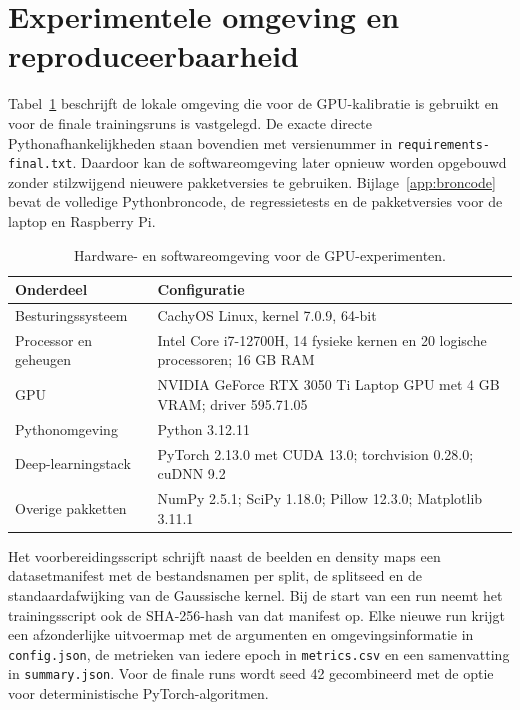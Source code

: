 \section{Experimentele omgeving en reproduceerbaarheid}

Tabel~\ref{tab:experimentele-omgeving} beschrijft de lokale omgeving die voor de GPU-kalibratie is gebruikt en voor de finale trainingsruns is vastgelegd. De exacte directe Pythonafhankelijkheden staan bovendien met versienummer in \texttt{requirements-final.txt}. Daardoor kan de softwareomgeving later opnieuw worden opgebouwd zonder stilzwijgend nieuwere pakketversies te gebruiken. Bijlage~\ref{app:broncode} bevat de volledige Pythonbroncode, de regressietests en de pakketversies voor de laptop en Raspberry Pi.

\begin{table}[htbp]
    \centering
    \small
    \begin{tabular}{>{\raggedright\arraybackslash}p{3.8cm}p{8.7cm}}
        \toprule
        \textbf{Onderdeel} & \textbf{Configuratie} \\
        \midrule
        Besturingssysteem & CachyOS Linux, kernel 7.0.9, 64-bit \\
        Processor en geheugen & Intel Core i7-12700H, 14 fysieke kernen en 20 logische processoren; 16 GB RAM \\
        GPU & NVIDIA GeForce RTX 3050 Ti Laptop GPU met 4 GB VRAM; driver 595.71.05 \\
        Pythonomgeving & Python 3.12.11 \\
        Deep-learningstack & PyTorch 2.13.0 met CUDA 13.0; torchvision 0.28.0; cuDNN 9.2 \\
        Overige pakketten & NumPy 2.5.1; SciPy 1.18.0; Pillow 12.3.0; Matplotlib 3.11.1 \\
        \bottomrule
    \end{tabular}
    \caption[Experimentele hardware- en softwareomgeving]{Hardware- en softwareomgeving voor de GPU-experimenten.}
    \label{tab:experimentele-omgeving}
\end{table}

Het voorbereidingsscript schrijft naast de beelden en density maps een datasetmanifest met de bestandsnamen per split, de splitseed en de standaardafwijking van de Gaussische kernel. Bij de start van een run neemt het trainingsscript ook de SHA-256-hash van dat manifest op. Elke nieuwe run krijgt een afzonderlijke uitvoermap met de argumenten en omgevingsinformatie in \texttt{config.json}, de metrieken van iedere epoch in \texttt{metrics.csv} en een samenvatting in \texttt{summary.json}. Voor de finale runs wordt seed 42 gecombineerd met de optie voor deterministische PyTorch-algoritmen.

